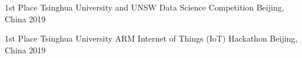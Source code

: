 



\begin{cvhonors}

  \cvhonor
    {1st Place} %
    {Tsinghua University and UNSW Data Science Competition} %
    {Beijing, China} %
    {2019} %

  \cvhonor
    {1st Place} %
    {Tsinghua University ARM Internet of Things (IoT) Hackathon} %
    {Beijing, China} %
    {2019} %

\end{cvhonors}




 

